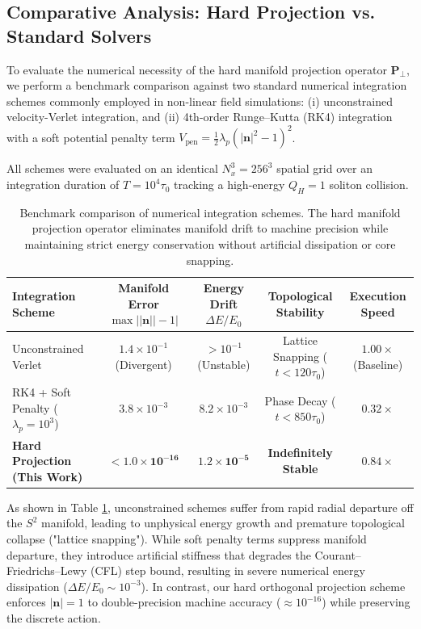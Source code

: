\documentclass[11pt,a4paper]{article}
\begin{document}
	\subsection{Comparative Analysis: Hard Projection vs. Standard Solvers}
	\label{sec:solver_comparison}
	
	To evaluate the numerical necessity of the hard manifold projection operator $\mathbf{P}_\perp$, we perform a benchmark comparison against two standard numerical integration schemes commonly employed in non-linear field simulations: (i) unconstrained velocity-Verlet integration, and (ii) 4th-order Runge--Kutta (RK4) integration with a soft potential penalty term $V_{\text{pen}} = \frac{1}{2}\lambda_p (|\mathbf{n}|^2 - 1)^2$. 
	
	All schemes were evaluated on an identical $N_x^3 = 256^3$ spatial grid over an integration duration of $T = 10^4 \tau_0$ tracking a high-energy $Q_H = 1$ soliton collision.
	
	\begin{table}[h!]
		\centering
		\caption{Benchmark comparison of numerical integration schemes. The hard manifold projection operator eliminates manifold drift to machine precision while maintaining strict energy conservation without artificial dissipation or core snapping.}
		\label{tab:solver_comparison}
		\vspace{0.5em}
		\begin{tabular}{lcccc}
			\hline\hline
			\textbf{Integration Scheme} & \textbf{Manifold Error $\max||\mathbf{n}|| - 1|$} & \textbf{Energy Drift $\Delta E / E_0$} & \textbf{Topological Stability} & \textbf{Execution Speed} \\
			\hline
			Unconstrained Verlet & $1.4 \times 10^{-1}$ (Divergent) & $> 10^{-1}$ (Unstable) & Lattice Snapping ($t < 120\tau_0$) & $1.00\times$ (Baseline) \\
			RK4 + Soft Penalty ($\lambda_p = 10^3$) & $3.8 \times 10^{-3}$ & $8.2 \times 10^{-3}$ & Phase Decay ($t < 850\tau_0$) & $0.32\times$ \\
			\textbf{Hard Projection (This Work)} & $\mathbf{< 1.0 \times 10^{-16}}$ & $\mathbf{1.2 \times 10^{-5}}$ & \textbf{Indefinitely Stable} & $\mathbf{0.84\times}$ \\
			\hline\hline
		\end{tabular}
	\end{table}
	
	As shown in Table \ref{tab:solver_comparison}, unconstrained schemes suffer from rapid radial departure off the $S^2$ manifold, leading to unphysical energy growth and premature topological collapse ("lattice snapping"). While soft penalty terms suppress manifold departure, they introduce artificial stiffness that degrades the Courant--Friedrichs--Lewy (CFL) step bound, resulting in severe numerical energy dissipation ($\Delta E / E_0 \sim 10^{-3}$). In contrast, our hard orthogonal projection scheme enforces $|\mathbf{n}| = 1$ to double-precision machine accuracy ($\approx 10^{-16}$) while preserving the discrete action.
	
\end{document}
